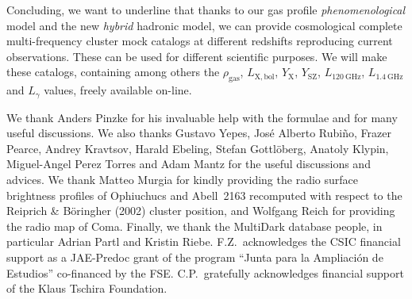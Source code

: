\documentclass[traditabstract]{aa}
\newcommand{\rmn}{\mathrm}
\begin{document}
Concluding, we want to underline that thanks to our gas profile \emph{phenomenological} model and the new \emph{hybrid} hadronic model, we can provide cosmological complete multi-frequency cluster mock catalogs at different redshifts reproducing current observations. These can be used for different scientific purposes. We will make these catalogs, containing among others the $\rho_{\rmn{gas}}$, $L_{\rmn{X, bol}}$, $Y_{\rmn{X}}$, $Y_{\rmn{SZ}}$, $L_{120~\rmn{GHz}}$, $L_{1.4~\rmn{GHz}}$ and $L_{\gamma}$ values, freely available on-line.


\begin{acknowledgements}
  We thank Anders Pinzke for his invaluable help with the formulae and for many
  useful discussions. We also thanks Gustavo Yepes, Jos\'e Alberto Rubi\~no,
  Frazer Pearce, Andrey Kravtsov, Harald Ebeling, Stefan Gottl\"{o}berg, Anatoly
  Klypin, Miguel-Angel Perez Torres and Adam Mantz for the useful discussions
  and advices. We thank Matteo Murgia for kindly providing the radio surface
  brightness profiles of Ophiuchucs and Abell~2163 recomputed with respect to
  the Reiprich \& B\"{o}ringher (2002) cluster position, and Wolfgang Reich for
  providing the radio map of Coma. Finally, we thank the MultiDark database
  people, in particular Adrian Partl and Kristin Riebe.  F.Z.{\ }acknowledges
  the CSIC financial support as a JAE-Predoc grant of the program ``Junta para
  la Ampliaci\'on de Estudios'' co-financed by the FSE. C.P.{\ }gratefully
  acknowledges financial support of the Klaus Tschira Foundation.
\end{acknowledgements}




\end{document}
